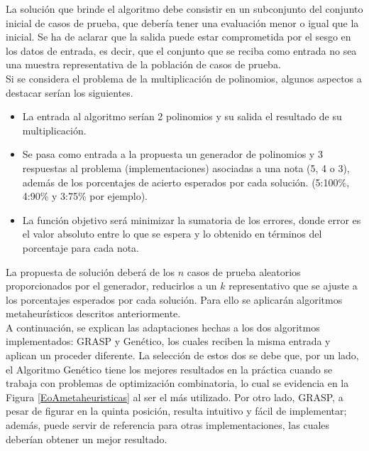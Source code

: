 \documentclass[a4paper,openright,11pt,oneside]{book}
\begin{document}
	La solución que brinde el algoritmo debe consistir en un subconjunto del conjunto inicial de casos de prueba, que debería tener una evaluación menor o igual que la inicial. Se ha de aclarar que la salida puede estar comprometida por el sesgo en los datos de entrada, es decir, que el conjunto que se reciba como entrada no sea una muestra representativa de la población de casos de prueba. \\
	
	Si se considera el problema de la multiplicación de polinomios, algunos aspectos a destacar serían los siguientes.
	\begin{itemize}
		\item La entrada al algoritmo serían 2 polinomios y su salida el resultado de su multiplicación.
		\item Se pasa como entrada a la propuesta un generador de polinomios y 3 respuestas al problema (implementaciones) asociadas a una nota (5, 4 o 3), además de los porcentajes de acierto esperados por cada solución. (5:100\%, 4:90\% y 3:75\% por ejemplo).
		\item La función objetivo será minimizar la sumatoria de los errores, donde error es el valor absoluto entre lo que se espera y lo obtenido en términos del porcentaje para cada nota.
	\end{itemize}

	La propuesta de solución deberá de los $n$ casos de prueba aleatorios proporcionados por el generador, reducirlos a un $k$ representativo que se ajuste a los porcentajes esperados por cada solución. Para ello se aplicarán algoritmos metaheurísticos descritos anteriormente. \\
	
	A continuación, se explican las adaptaciones hechas a los dos algoritmos implementados: GRASP y Genético, los cuales reciben la misma entrada y aplican un proceder diferente. La selección de estos dos se debe que, por un lado, el Algoritmo Genético tiene los mejores resultados en la práctica cuando se trabaja con problemas de optimización combinatoria, lo cual se evidencia en la Figura \ref{EoAmetaheuristicas} al ser el más utilizado. Por otro lado, GRASP, a pesar de figurar en la quinta posición, resulta intuitivo y fácil de implementar; además, puede servir de referencia para otras implementaciones, las cuales deberían obtener un mejor resultado.
	
\end{document}
